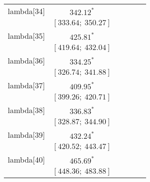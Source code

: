 \begin{table}
\begin{center}
\begin{tabular}{l c c c c c }
lambda[34]  & $342.12^{*}$                     &                           &                           &                         &                         \\
            & $[333.64;\ 350.27]$              &                           &                           &                         &                         \\
lambda[35]  & $425.81^{*}$                     &                           &                           &                         &                         \\
            & $[419.64;\ 432.04]$              &                           &                           &                         &                         \\
lambda[36]  & $334.25^{*}$                     &                           &                           &                         &                         \\
            & $[326.74;\ 341.88]$              &                           &                           &                         &                         \\
lambda[37]  & $409.95^{*}$                     &                           &                           &                         &                         \\
            & $[399.26;\ 420.71]$              &                           &                           &                         &                         \\
lambda[38]  & $336.83^{*}$                     &                           &                           &                         &                         \\
            & $[328.87;\ 344.90]$              &                           &                           &                         &                         \\
lambda[39]  & $432.24^{*}$                     &                           &                           &                         &                         \\
            & $[420.52;\ 443.47]$              &                           &                           &                         &                         \\
lambda[40]  & $465.69^{*}$                     &                           &                           &                         &                         \\
            & $[448.36;\ 483.88]$              &                           &                           &                         &                         \\

\end{tabular}
\end{center}
\end{table}
